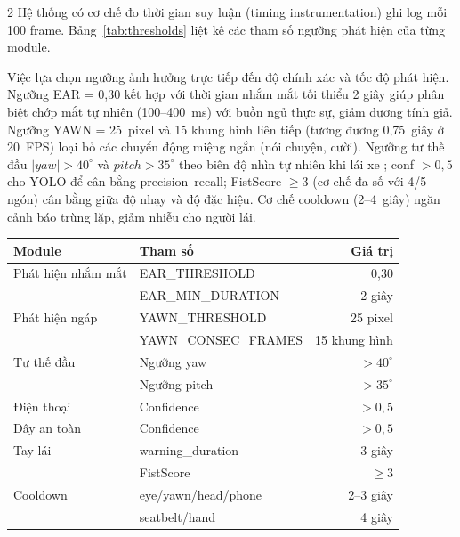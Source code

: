 \documentclass[10pt]{article}
\begin{document}
\begin{multicols}{2}
Hệ thống có cơ chế đo thời gian suy luận (timing instrumentation) ghi log mỗi 100 frame. Bảng~\ref{tab:thresholds} liệt kê các tham số ngưỡng phát hiện của từng module.

Việc lựa chọn ngưỡng ảnh hưởng trực tiếp đến độ chính xác và tốc độ phát hiện. Ngưỡng EAR = 0{,}30 kết hợp với thời gian nhắm mắt tối thiểu 2 giây giúp phân biệt chớp mắt tự nhiên (100--400~ms) với buồn ngủ thực sự, giảm dương tính giả. Ngưỡng YAWN = 25~pixel và 15 khung hình liên tiếp (tương đương 0{,}75~giây ở 20~FPS) loại bỏ các chuyển động miệng ngắn (nói chuyện, cười). Ngưỡng tư thế đầu $\vert{}yaw\vert{} > 40^\circ$ và $pitch > 35^\circ$ theo biên độ nhìn tự nhiên khi lái xe \cite{lawson2020}; conf $>0{,}5$ cho YOLO để cân bằng precision--recall; FistScore $\geq 3$ (cơ chế đa số với 4/5 ngón) cân bằng giữa độ nhạy và độ đặc hiệu. Cơ chế cooldown (2--4~giây) ngăn cảnh báo trùng lặp, giảm nhiễu cho người lái.

\vspace{4pt}
\noindent
\begin{minipage}{\columnwidth}
\centering
{}
\label{tab:thresholds}
\fontsize{7}{8.5}\selectfont
\setlength{\tabcolsep}{2.5pt}
\begin{tabular}{llr}
\toprule
Module & Tham số & Giá trị \\
\midrule
Phát hiện nhắm mắt & EAR\_THRESHOLD & 0,30 \\
 & EAR\_MIN\_DURATION & 2 giây \\
Phát hiện ngáp & YAWN\_THRESHOLD & 25 pixel \\
 & YAWN\_CONSEC\_FRAMES & 15 khung hình \\
Tư thế đầu & Ngưỡng yaw & $>40^\circ$ \\
 & Ngưỡng pitch & $>35^\circ$ \\
Điện thoại & Confidence & $>0,5$ \\
Dây an toàn & Confidence & $>0,5$ \\
Tay lái & warning\_duration & 3 giây \\
 & FistScore & $\geq 3$ \\
\midrule
Cooldown & eye/yawn/head/phone & 2--3 giây \\
 & seatbelt/hand & 4 giây \\
\bottomrule
\end{tabular}
\end{minipage}


\end{multicols}
\end{document}
